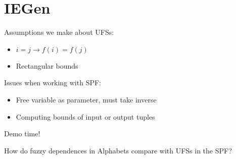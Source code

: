 \documentclass[t,handout]{beamer}
\begin{document}
\section{IEGen}
\begin{frame}
Assumptions we make about UFSs:\\
\begin{itemize}
\item $i=j \rightarrow f(i)=f(j)$
\item Rectangular bounds
\end{itemize}
\bigskip{}
Issues when working with SPF:\\
\begin{itemize}
\item Free variable as parameter, must take inverse
\item Computing bounds of input or output tuples
\end{itemize}
\end{frame}

\begin{frame}
Demo time!
\end{frame}

\begin{frame}
How do fuzzy dependences in Alphabets compare with UFSs in the SPF?
\end{frame}
\end{document}
